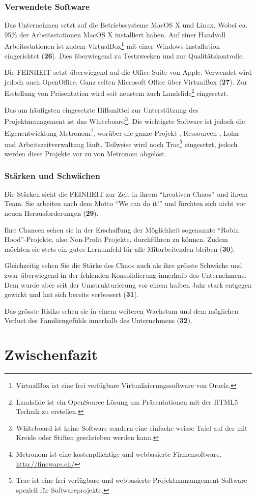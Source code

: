 \subsubsection{Verwendete Software}
Das Unternehmen setzt auf die Betriebssysteme MacOS X und Linux. Wobei ca.
95\% der Arbeitsstationen MacOS X installiert haben. Auf einer Handvoll 
Arbeitsstationen ist zudem VirtualBox\footnote{VirtualBox ist eine frei verfügbare
Virtualisierungssoftware von Oracle.} mit einer Windows Installation eingerichtet (\textbf{26}).
Dies überwiegend zu Testzwecken und zur Qualitätskontrolle.

Die FEINHEIT setzt überwiegend auf die Office Suite von Apple. Verwendet wird
jedoch auch OpenOffice. Ganz selten Microsoft Office über VirtualBox (\textbf{27}).
Zur Erstellung von Präsentation wird seit neustem auch Landslide\footnote{Landslide
ist ein OpenSource Lösung um Präsentationen mit der HTML5 Technik zu erstellen.} 
eingesetzt.

Das am häufigsten eingesetzte Hilfsmittel zur Unterstützung des Projektmanagement
ist das Whiteboard\footnote{Whiteboard ist keine Software sondern eine einfache
weisse Tafel auf der mit Kreide oder Stiften geschrieben werden kann.}. Die 
wichtigste Software ist jedoch die Eigenentwicklung Metronom\footnote{Metronom 
ist eine kostenpflichtige und webbasierte Firmensoftware. \url{http://fineware.ch/}}, worüber die ganze
Projekt-, Ressourcen-, Lohn- und Arbeitszeitverwaltung läuft. Teilweise wird
noch Trac\footnote{Trac ist eine frei verfügbare und webbasierte 
Projektmanamgement-Software speziell für Softwareprojekte.} eingesetzt, jedoch 
werden diese Projekte vor zu von Metronom abgelöst.

\subsubsection{Stärken und Schwächen}
Die Stärken sieht die FEINHEIT zur Zeit in ihrem ``kreativen Chaos'' und ihrem
Team. Sie arbeiten nach dem Motto ``We can do it!'' und fürchten sich nicht 
vor neuen Herausforderungen (\textbf{29}).

Ihre Chancen sehen sie in der Erschaffung der Möglichkeit sogenannte ``Robin Hood''-Projekte,
also Non-Profit Projekte, durchführen zu können. Zudem möchten sie stets ein
gutes Lernumfeld für alle Mitarbeitenden bleiben (\textbf{30}).

Gleichzeitig sehen Sie die Stärke des Chaos auch als ihre grösste Schwäche und 
zwar überwiegend in der fehlenden Konsolidierung innerhalb des Unternehmens. 
Dem wurde aber seit der Umstrukturierung vor einem halben Jahr stark entgegen
gewirkt und hat sich bereits verbessert (\textbf{31}).

Das grösste Risiko sehen sie in einem weiteren Wachstum und dem möglichen 
Verlust des Familiengefühls innerhalb des Unternehmens (\textbf{32}).

\section{Zwischenfazit}
